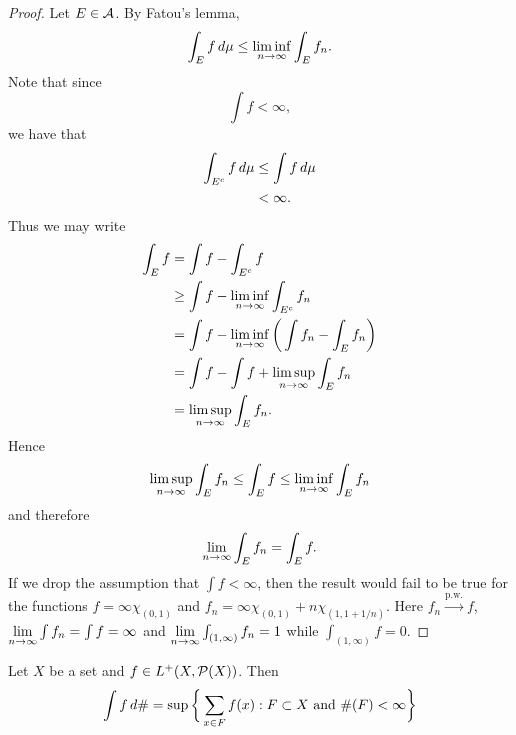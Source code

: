 \documentclass{book}
\begin{document}
	\begin{proof}
		Let $E \in \mathcal{A}$. By Fatou's lemma, 
		$$\int_E f \, d \mu \leq \liminf \limits_{n \rightarrow \infty} \int_E f_n.$$ 
		Note that since 
		$$\int f < \infty,$$ we have that 
		\begin{align*}
			\int_{E^c} f \, d \mu 
			& \leq \int f \, d \mu  \\
			& < \infty.
		\end{align*} 
		Thus we may write
		\begin{align*}
			\int_E f 
			&= \int f - \int_{E^c} f\\
			&\geq \int f - \liminf \limits_{n \rightarrow \infty} \int_{E^c} f_n\\
			&= \int f - \liminf \limits_{n \rightarrow \infty} \bigg(\int f_n - \int_{E} f_n\bigg)\\
			&= \int f - \int f  + \limsup \limits_{n \rightarrow \infty} \int_{E} f_n\\
			&= \limsup \limits_{n \rightarrow \infty} \int_E f_n.
		\end{align*}
		Hence 
		$$\limsup \limits_{n \rightarrow \infty} \int_E f_n \leq \int_E f \leq \liminf \limits_{n \rightarrow \infty} \int_E f_n$$ and therefore $$\lim \limits_{n \rightarrow \infty} \int_E f_n = \int_E f.$$ 
		If we drop the assumption that $\int f < \infty$, then the result would fail to be true for the functions $f = \infty \chi_{(0,1)}$ and $ f_n = \infty \chi_{(0,1)} + n \chi_{(1,1+1/n)}$. Here $f_n \xrightarrow{\text{p.w.}} f$, $\lim \limits_{n \rightarrow \infty} \int f_n = \int f = \infty$ and $\lim \limits_{n \rightarrow \infty} \int_{(1,\infty)} f_n = 1$ while $\int_{(1,\infty)} f = 0$.  
	\end{proof}

	\begin{ex}  
		Let $X$ be a set and $f \in L^+(X, \mathcal{P}(X))$. Then 
		$$\int f \, d \# =  \sup \bigg \{\sum_{x \in F}f(x): F \subset X \text{ and } \#(F) < \infty \bigg \}$$
	\end{ex} 
\end{document}
